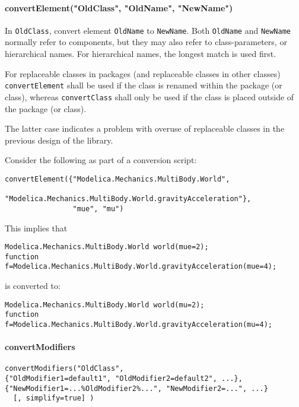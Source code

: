 \paragraph*{convertElement("OldClass", "OldName", "NewName")}\label{convertelementoldclassoldnamenewname}

In \lstinline!OldClass!, convert element \lstinline!OldName! to \lstinline!NewName!.  Both \lstinline!OldName! and \lstinline!NewName! normally refer to components, but they may also refer to
class-parameters, or hierarchical names.  For hierarchical names, the longest match is used first.

For replaceable classes in packages (and replaceable classes in other classes) \lstinline!convertElement! shall
be used if the class is renamed within the package (or class), whereas \lstinline!convertClass! shall only be used if the class
is placed outside of the package (or class).

\begin{nonnormative}
The latter case indicates a problem with overuse of replaceable classes in the previous design of the library.
\end{nonnormative}

\begin{example}
Consider the following as part of a conversion script:
\begin{lstlisting}[language=modelica]
convertElement({"Modelica.Mechanics.MultiBody.World",
                "Modelica.Mechanics.MultiBody.World.gravityAcceleration"},
                "mue", "mu")
\end{lstlisting}
This implies that
\begin{lstlisting}[language=modelica]
Modelica.Mechanics.MultiBody.World world(mue=2);
function f=Modelica.Mechanics.MultiBody.World.gravityAcceleration(mue=4);
\end{lstlisting}
is converted to:
\begin{lstlisting}[language=modelica]
Modelica.Mechanics.MultiBody.World world(mu=2);
function f=Modelica.Mechanics.MultiBody.World.gravityAcceleration(mu=4);
\end{lstlisting}
\end{example}

\paragraph*{convertModifiers}\label{convertmodifiers}

\begin{lstlisting}[language=modelica]
convertModifiers("OldClass",
{"OldModifier1=default1", "OldModifier2=default2", ...},
{"NewModifier1=...%OldModifier2%...", "NewModifier2=...", ...}
  [, simplify=true] )
\end{lstlisting}

